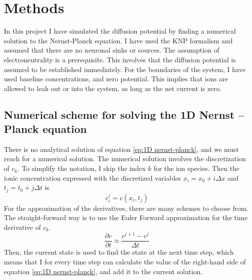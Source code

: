\documentclass{article}
\begin{document}
\section{Methods}
In this project I have  simulated the diffusion potential by finding a numerical solution to the Nernst-Planck equation. I have used the KNP formalism and assumed that there are no neuronal sinks or sources. The assumption of electroneutrality is a prerequisite. This involves that the diffusion potential is assumed to be established immediately. For the boundaries of the system, I have used baseline concentrations, and zero potential. This implies that ions are allowed to leak out or into the system, as long as the net current is zero. 
\subsection{Numerical scheme for solving the 1D Nernst -- Planck equation}\label{Numerical scheme}

There is no analytical solution of equation \ref{eq:1D nernst-planck}, and we must reach for a numerical solution. The numerical solution involves the discretization of $c_k$. To simplify the notation, I skip the index $k$ for the ion species. Then the ionic concentration expressed with the discretized variables $x_i = x_0 +i \Delta x$ and $t_j = t_0 + j \Delta t$ is 
$$c_i^j = c(x_i, t_j)$$
For the approximation of the derivatives, there are many schemes to choose from. The straight-forward way is to use the Euler Forward approximation for the time derivative of $c_k$.
$$\frac{\partial c}{\partial t} \approx \frac{c^{j+1}-c^j}{\Delta t}$$
Then, the current state is used to find the state at the next time step, which means that I for every time step can calculate the value of the right-hand side of equation \ref{eq:1D nernst-planck}, and add it to the current solution. 
\end{document}

